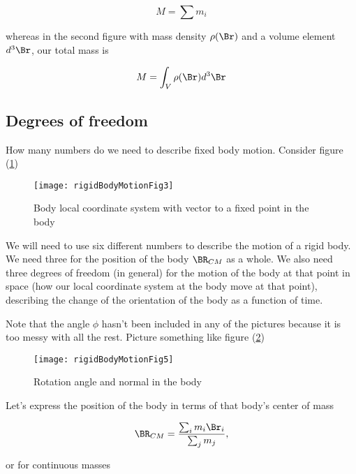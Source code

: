 \begin{equation}\label{eqn:rigidBodyMotion:20}
M = \sum m_i
\end{equation}

whereas in the second figure with mass density $\rho(\Br)$ and a volume element $d^3\Br$, our total mass is

\begin{equation}\label{eqn:rigidBodyMotion:40}
M = \int_V \rho(\Br) d^3\Br
\end{equation}

\subsection{Degrees of freedom}

How many numbers do we need to describe fixed body motion.  Consider figure (\ref{fig:rigidBodyMotion:rigidBodyMotionFig3})
\begin{figure}[htp]
   \centering
   \texttt{[image: rigidBodyMotionFig3]}
   \caption{Body local coordinate system with vector to a fixed point in the body}\label{fig:rigidBodyMotion:rigidBodyMotionFig3}
\end{figure}

We will need to use six different numbers to describe the motion of a rigid body.  We need three for the position of the body $\BR_{CM}$ as a whole.  We also need three degrees of freedom (in general) for the motion of the body at that point in space (how our local coordinate system at the body move at that point), describing the change of the orientation of the body as a function of time.

Note that the angle $\phi$ hasn't been included in any of the pictures because it is too messy with all the rest.  Picture something like figure (\ref{fig:rigidBodyMotion:rigidBodyMotionFig5})
\begin{figure}[htp]
   \centering
   \texttt{[image: rigidBodyMotionFig5]}
   \caption{Rotation angle and normal in the body}\label{fig:rigidBodyMotion:rigidBodyMotionFig5}
\end{figure}

Let's express the position of the body in terms of that body's center of mass 

\begin{equation}\label{eqn:rigidBodyMotion:60}
\BR_{CM} = \frac{\sum_i m_i \Br_i}{\sum_j m_j},
\end{equation}

or for continuous masses

